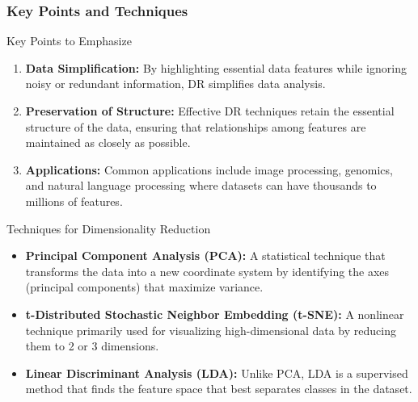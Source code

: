\documentclass[aspectratio=169]{beamer}
\begin{document}
\begin{frame}[fragile]
    \frametitle{Key Points and Techniques}
    \begin{block}{Key Points to Emphasize}
        \begin{enumerate}
            \item \textbf{Data Simplification:} 
            By highlighting essential data features while ignoring noisy or redundant information, DR simplifies data analysis.
            
            \item \textbf{Preservation of Structure:} 
            Effective DR techniques retain the essential structure of the data, ensuring that relationships among features are maintained as closely as possible.
            
            \item \textbf{Applications:} 
            Common applications include image processing, genomics, and natural language processing where datasets can have thousands to millions of features.
        \end{enumerate}
    \end{block}
    \begin{block}{Techniques for Dimensionality Reduction}
        \begin{itemize}
            \item \textbf{Principal Component Analysis (PCA):} A statistical technique that transforms the data into a new coordinate system by identifying the axes (principal components) that maximize variance.
            \item \textbf{t-Distributed Stochastic Neighbor Embedding (t-SNE):} A nonlinear technique primarily used for visualizing high-dimensional data by reducing them to 2 or 3 dimensions.
            \item \textbf{Linear Discriminant Analysis (LDA):} Unlike PCA, LDA is a supervised method that finds the feature space that best separates classes in the dataset.
        \end{itemize}
    \end{block}
\end{frame}
\end{document}
